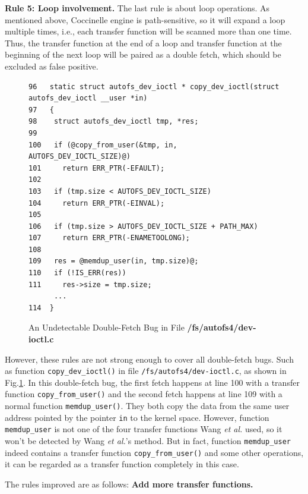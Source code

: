 \documentclass[10pt]{llncs}
\begin{document}
\textbf{Rule 5: Loop involvement.}
The last rule is about loop operations. As mentioned above, Coccinelle engine is path-sensitive, so it will expand a loop multiple times, i.e., each transfer function will be scanned more than one time. Thus, the transfer function at the end of a loop and transfer function at the beginning of the next loop will be paired as a double fetch, which should be excluded as false positive.




\begin{figure}[t]
  \centering
\begin{lstlisting}[style=code]
96   static struct autofs_dev_ioctl * copy_dev_ioctl(struct autofs_dev_ioctl __user *in)
97   {
98    struct autofs_dev_ioctl tmp, *res;
99   
100   if (@copy_from_user(&tmp, in, AUTOFS_DEV_IOCTL_SIZE)@)
101     return ERR_PTR(-EFAULT);
102  
103   if (tmp.size < AUTOFS_DEV_IOCTL_SIZE)
104     return ERR_PTR(-EINVAL);
105  
106   if (tmp.size > AUTOFS_DEV_IOCTL_SIZE + PATH_MAX)
107     return ERR_PTR(-ENAMETOOLONG);
108  
109   res = @memdup_user(in, tmp.size)@;
110   if (!IS_ERR(res))
111     res->size = tmp.size;
	  ...
114  }   
\end{lstlisting}
  \caption{An Undetectable Double-Fetch Bug in File \textbf{/fs/autofs4/dev-ioctl.c}}
  \label{dev-ioctl}
\end{figure}




However, these rules are not strong enough to cover all double-fetch bugs. Such as function \verb:copy_dev_ioctl(): in file \verb:/fs/autofs4/dev-ioctl.c:, as shown in Fig.\ref{dev-ioctl}. In this double-fetch bug, the first fetch happens at line 100 with a transfer function \verb:copy_from_user(): and the second fetch happens at line 109 with a normal function \verb:memdup_user():. They both copy the data from the same user address pointed by the pointer \verb:in: to the kernel space. However, function \verb:memdup_user: is not one of the four transfer functions Wang \textit{et al.} used, so it won't be detected by Wang \textit{et al.}'s method. But in fact, function \verb:memdup_user: indeed contains a transfer function \verb:copy_from_user(): and some other operations, it can be regarded as a transfer function completely in this case.

The rules improved are as follows:
\textbf{Add more transfer functions.}
\end{document}
